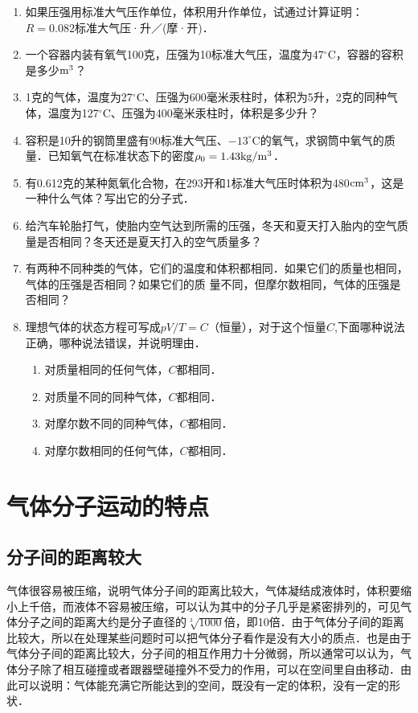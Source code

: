 \begin{enumerate}
    \item 如果压强用标准大气压作单位，体积用升作单位，试通过计算证明：$R=0.082$标准大气压·升／(摩·开)．
\item 一个容器内装有氧气100克，压强为10标准大气压，温度为47$^\circ$C，容器的容积是多少${\rm m^3}$？
\item 1克的气体，温度为27$^\circ$C、压强为600毫米汞柱时，体积为5升，2克的同种气体，温度为127$^\circ$C、压强为400毫米汞柱时，体积是多少升？
\item 容积是10升的钢筒里盛有90标准大气压、$-13^\circ$C的氧气，求钢筒中氧气的质量．已知氧气在标准状态下的密度$\rho_0=1.43{\rm kg}/{\rm m^3}$．
\item 有0.612克的某种氮氧化合物，在293开和1标准大气压时体积为480${\rm cm^3}$，这是一种什么气体？写出它的分子式．
\item 给汽车轮胎打气，使胎内空气达到所需的压强，冬天和夏天打入胎内的空气质量是否相同？冬天还是夏天打入的空气质量多？
\item 有两种不同种类的气体，它们的温度和体积都相同．如果它们的质量也相同，气体的压强是否相同？如果它们的质
量不同，但摩尔数相同，气体的压强是否相同？
\item 理想气体的状态方程可写成$pV/T=C$（恒量），对于这个恒量$C$,下面哪种说法正确，哪种说法错误，并说明理由．
\begin{enumerate}
\item 对质量相同的任何气体，$C$都相同．
\item 对质量不同的同种气体，$C$都相同．    
\item 对摩尔数不同的同种气体，$C$都相同．
\item 对摩尔数相同的任何气体，$C$都相同．
\end{enumerate}
\end{enumerate}

\section{气体分子运动的特点}
\subsection{分子间的距离较大} 
气体很容易被压缩，说明气体分子间的距离比较大，气体凝结成液体时，体积要缩小上千倍，而液体不容易被压缩，可以认为其中的分子几乎是紧密排列的，可见气体分子之间的距离大约是分子直径的$\sqrt[3]{1000}$倍，即10倍．由于气体分子间的距离比较大，所以在处理某些问题时可以把气体分子看作是没有大小的质点．也是由于气体分子间的距离比较大，分子间的相互作用力十分微弱，所以通常可以认为，气体分子除了相互碰撞或者跟器壁碰撞外不受力的作用，可以在空间里自由移动．由此可以说明：气体能充满它所能达到的空间，既没有一定的体积，没有一定的形状．

